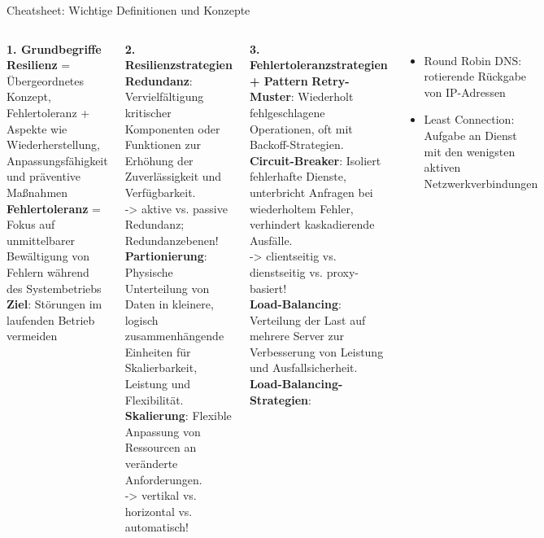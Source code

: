 \begin{frame}[shrink=10]{Cheatsheet: Wichtige Definitionen und Konzepte}
    \scriptsize
    \justifying

    \begin{columns}[t]
        \textbf{1. Grundbegriffe}\\
        \textbf{Resilienz} = Übergeordnetes Konzept, Fehlertoleranz + Aspekte wie
        Wiederherstellung, Anpassungsfähigkeit und präventive Maßnahmen\\
        \textbf{Fehlertoleranz} = Fokus auf unmittelbarer Bewältigung von Fehlern während des
        Systembetriebs\\
        \textbf{Ziel}: Störungen im laufenden Betrieb vermeiden

        \textbf{2. Resilienzstrategien}\\
            \textbf{Redundanz}: Vervielfältigung kritischer Komponenten oder Funktionen zur Erhöhung der
            Zuverlässigkeit und Verfügbarkeit.\\
        -> aktive vs. passive Redundanz; Redundanzebenen!\\
            \textbf{Partionierung}: Physische Unterteilung von Daten in kleinere, logisch zusammenhängende Einheiten
            für Skalierbarkeit, Leistung und Flexibilität.\\
            \textbf{Skalierung}: Flexible Anpassung von Ressourcen an veränderte Anforderungen.\\
        -> vertikal vs. horizontal vs. automatisch!


        \textbf{3. Fehlertoleranzstrategien + Pattern}
            \textbf{Retry-Muster}: Wiederholt fehlgeschlagene Operationen, oft mit Backoff-Strategien.\\
            \textbf{Circuit-Breaker}: Isoliert fehlerhafte Dienste, unterbricht Anfragen bei wiederholtem Fehler,
            verhindert kaskadierende Ausfälle.\\
        -> clientseitig vs. dienstseitig vs. proxy-basiert!\\
            \textbf{Load-Balancing}: Verteilung der Last auf mehrere Server zur Verbesserung von Leistung und
            Ausfallsicherheit.\\
            \textbf{Load-Balancing-Strategien}:
            \begin{itemize}
                \item Round Robin DNS: rotierende Rückgabe von IP-Adressen
                \item Least Connection: Aufgabe an Dienst mit den wenigsten aktiven Netzwerkverbindungen
            \end{itemize}
    \end{columns}
\end{frame}
